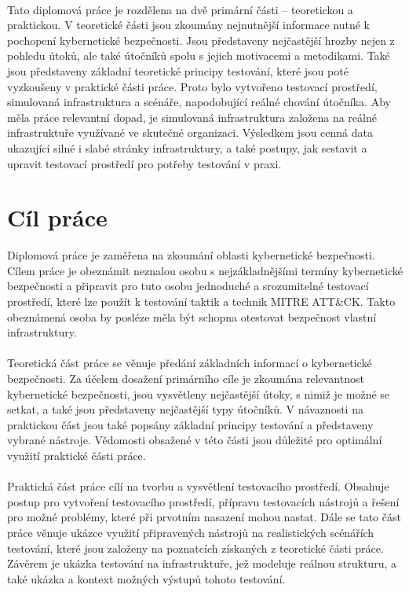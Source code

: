 \paragraph{}
Tato diplomová práce je rozdělena na dvě primární části -- teoretickou a praktickou.
V teoretické části jsou zkoumány nejnutnější informace nutné k pochopení kybernetické bezpečnosti.
Jsou představeny nejčastější hrozby nejen z pohledu útoků, ale také útočníků spolu s jejich motivacemi a metodikami.
Také jsou představeny základní teoretické principy testování, které jsou poté vyzkoušeny v praktické části práce.
Proto bylo vytvořeno testovací prostředí, simulovaná infrastruktura a scénáře, napodobující reálné chování útočníka.
Aby měla práce relevantní dopad, je simulovaná infrastruktura založena na reálné infrastruktuře využívané ve skutečné organizaci.
Výsledkem jsou cenná data ukazující silné i slabé stránky infrastruktury, a také postupy, jak sestavit a upravit testovací prostředí pro potřeby testování v praxi.


\section{Cíl práce}\label{sec:cil-prace}
Diplomová práce je zaměřena na zkoumání oblasti kybernetické bezpečnosti.
Cílem práce je obeznámit neznalou osobu s nejzákladnějšími termíny kybernetické bezpečnosti a připravit pro tuto osobu jednoduché a srozumitelné testovací prostředí, které lze použít k testování taktik a technik MITRE ATT\&CK\@.
Takto obeznámená osoba by posléze měla být schopna otestovat bezpečnost vlastní infrastruktury.

\paragraph{}
Teoretická část práce se věnuje předání základních informací o kybernetické bezpečnosti.
Za účelem dosažení primárního cíle je zkoumána relevantnost kybernetické bezpečnosti, jsou vysvětleny nejčastější útoky, s nimiž je možné se setkat, a také jsou představeny nejčastější typy útočníků.
V návaznosti na praktickou část jsou také popsány základní principy testování a představeny vybrané nástroje.
Vědomosti obsažené v této části jsou důležité pro optimální využití praktické části práce.

\paragraph{}
Praktická část práce cílí na tvorbu a vysvětlení testovacího prostředí.
Obsahuje postup pro vytvoření testovacího prostředí, přípravu testovacích nástrojů a řešení pro možné problémy, které při prvotním nasazení mohou nastat.
Dále se tato část práce věnuje ukázce využití připravených nástrojů na realistických scénářích testování, které jsou založeny na poznatcích získaných z teoretické části práce.
Závěrem je ukázka testování na infrastruktuře, jež modeluje reálnou strukturu, a také ukázka a kontext možných výstupů tohoto testování.



